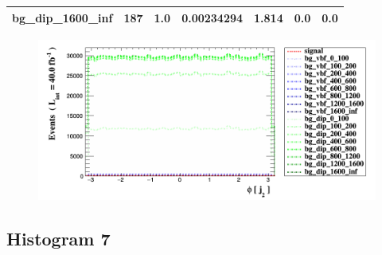 \documentclass[a4paper, 10pt]{article}
\begin{document}
\begin{table}[H]
\begin{center}
\begin{tabular}{|m{23.0mm}|m{23.0mm}|m{18.0mm}|m{19.0mm}|m{19.0mm}|m{19.0mm}|m{19.0mm}|}
      \hline
      {\cellcolor{white}         bg\_dip\_1600\_inf}& {\cellcolor{white}         187}& {\cellcolor{white}         1.0}& {\cellcolor{white}         0.00234294}& {\cellcolor{white}         1.814}& {\cellcolor{green}         0.0}& {\cellcolor{green}         0.0}\\
\hline
    \end{tabular}
  \end{center}
\end{table}

\begin{figure}[H]
  \begin{center}
    \includegraphics[scale=0.45]{selection_5.png}\\
\caption{   }
  \end{center}
\end{figure}
      \newpage
\subsection{ Histogram 7}
\end{document}
